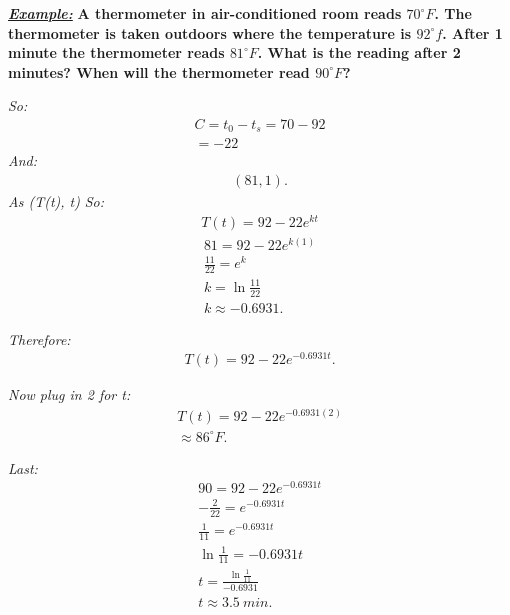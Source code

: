 \documentclass{report}
\begin{document}
    \bigbreak \noindent 
    \begin{mdframed}
      \textbf{\textit{\underline{Example:}}} \textbf{A thermometer in air-conditioned room
        reads $70^{\circ}F$. The thermometer is taken outdoors where the temperature is $92^{\circ}f$.
        After 1 minute the thermometer reads $81^{\circ}F$. What is the reading after 2 minutes? When will
        the thermometer read $90^{\circ}F$?
      }
    \end{mdframed}
    \bigbreak \noindent
    \textit{So:}
    \begin{align*}
      C =  t_0 - t_s = 70-92\\
      = -22
    \end{align*}
    \bigbreak \noindent 
    \textit{And:}
    \begin{align*}
      (81,1)
    .\end{align*}
    \bigbreak \noindent 
    \textit{As (T(t), t)}
    \bigbreak \noindent
    \textit{So:}
    \begin{align*}
      T(t) = 92 - 22e^{kt}      
    \end{align*}
    \begin{align*}
      81 = 92-22e^{k(1)} \\
      \frac{11}{22} = e^{k} \\
      k = \ln{\frac{11}{22}} \\
      k \approx -0.6931
    .\end{align*}

    \bigbreak \noindent 
    \textit{Therefore:}
    \begin{align*}
      T(t) = 92 -22e^{-0.6931t}
    .\end{align*}

    \bigbreak \noindent 
    \textit{Now plug in 2 for t:}
    \begin{align*}
      T(t) = 92-22e^{-0.6931(2)} \\
      \approx 86^{\circ}F
    .\end{align*}

    \bigbreak \noindent 
    \textit{Last:}
    \begin{align*}
      90 = 92- 22e^{-0.6931t} \\ 
      -\frac{2}{22} = e^{-0.6931t} \\
      \frac{1}{11} = e^{-0.6931t} \\
      \ln{\frac{1}{11}} = -0.6931t \\
      t = \frac{\ln{\frac{1}{11}}}{-0.6931} \\
      t  \approx 3.5\ min
    .\end{align*}






    





  
\end{document}
